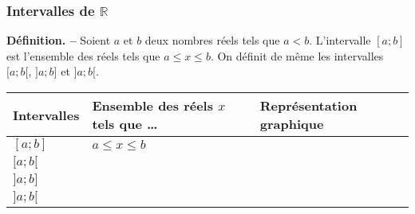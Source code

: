 \documentclass[handout]{beamer}
\begin{document}
\title{}

\date{}

\begin{frame}
  \frametitle{Intervalles de $\mathbb{R}$}
  \textbf{Définition. --} Soient $a$ et $b$ deux nombres réels tels que $a<b$. L'intervalle $[a;b]$ est l'ensemble des réels tels que $a\leq x\leq b$. On définit de même les intervalles $[a;b[$, $]a;b]$ et $]a;b[$.

  \bigskip

  \begin{center}
    \renewcommand{\arraystretch}{1.2}
    \begin{tabular}{|>{\centering}m{2cm}|>{\centering}m{4cm}|>{\centering}m{4cm}|}
      \hline
      \textbf{Intervalles} & \textbf{Ensemble des réels $x$ tels que \dots} & \textbf{Représentation graphique}\tabularnewline
      \hline
      $[a;b]$ & $a\leq x\leq b$ & \tabularnewline
      \hline
      $[a;b[$ & & \tabularnewline
      \hline
      $]a;b]$ & & \tabularnewline
      \hline
      $]a;b[$ & & \tabularnewline
      \hline
    \end{tabular}
  \end{center}
\end{frame}
\end{document}
